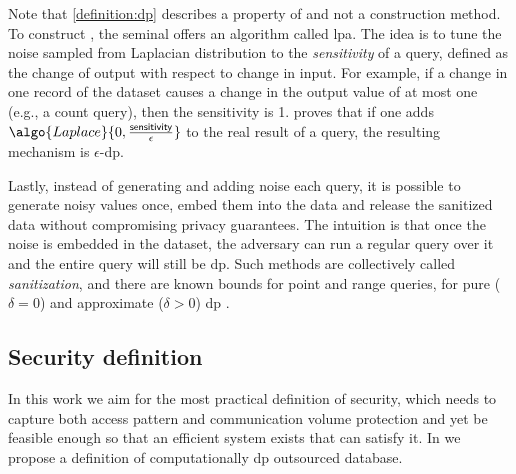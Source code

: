 				Note that \cref{definition:dp} describes a property of  and not a construction method.
				To construct , the seminal \cite{differential-privacy-original} offers an algorithm called \acrfull{lpa}.
				The idea is to tune the noise sampled from Laplacian distribution to the \emph{sensitivity} of a query, defined as the change of output with respect to change in input.
				For example, if a change in one record of the dataset causes a change in the output value of at most one (e.g., a count query), then the sensitivity is 1.
				\cite{differential-privacy-original} proves that if one adds $\algo{Laplace}{0, \frac{\mathsf{sensitivity}}{\epsilon}}$ to the real result of a query, the resulting mechanism is $\epsilon$-\acrshort{dp}.

				Lastly, instead of generating and adding noise each query, it is possible to generate noisy values once, embed them into the data and release the sanitized data without compromising privacy guarantees.
				The intuition is that once the noise is embedded in the dataset, the adversary can run a regular query over it and the entire query will still be \acrshort{dp}.
				Such methods are collectively called \emph{sanitization}, and there are known bounds for point and range queries, for pure ($\delta = 0$) and approximate ($\delta > 0$) \acrshort{dp} \cite{bounds-on-sample-complexity,private-learning-and-sanitization,non-interactive-database-privacy,dp-under-observation,dp-release,privately-learning-thresholds}.

		\subsection{Security definition}

			In this work we aim for the most practical definition of security, which needs to capture both access pattern and communication volume protection and yet be feasible enough so that an efficient system exists that can satisfy it.
			In \epsolute{} \cite{epsolute} we propose a definition of computationally \acrshort{dp} outsourced database.

